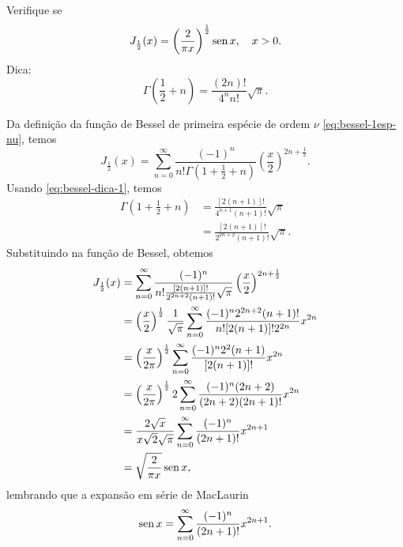   \begin{exeresol}
    Verifique se
    \begin{equation}
      J_{\frac{1}{2}}(x) = \left(\frac{2}{\pi x}\right)^{\frac{1}{2}}\operatorname{sen} x,\quad x>0.
    \end{equation}
    Dica:
    \begin{equation}\label{eq:bessel-dica-1}
      \Gamma\left(\frac{1}{2}+n\right) = \frac{(2n)!}{4^nn!}\sqrt{\pi}.
    \end{equation}
  \end{exeresol}
  \begin{resol}
    Da definição da função de Bessel de primeira espécie de ordem $\nu$ \eqref{eq:bessel-1esp-nu}, temos
    \begin{equation}
      J_{\frac{1}{2}}(x) = \sum_{n=0}^\infty \frac{(-1)^n}{n!\Gamma\left(1+\frac{1}{2}+n\right)}\left(\frac{x}{2}\right)^{2n+\frac{1}{2}}.
    \end{equation}
    Usando \eqref{eq:bessel-dica-1}, temos
    \begin{align}
      \Gamma\left(1+\frac{1}{2}+n\right) &= \frac{[2(n+1)]!}{4^{n+1}(n+1)!}\sqrt{\pi}\\
      &= \frac{[2(n+1)]!}{2^{2n+2}(n+1)!}\sqrt{\pi}. 
    \end{align}
    Substituindo na função de Bessel, obtemos
    \begin{align}
      J_{\frac{1}{2}}(x) &= \sum_{n=0}^\infty \frac{(-1)^n}{n!\frac{[2(n+1)]!}{2^{2n+2}(n+1)!}\sqrt{\pi}}\left(\frac{x}{2}\right)^{2n+\frac{1}{2}}\\
      &= \left(\frac{x}{2}\right)^{\frac{1}{2}}\frac{1}{\sqrt{\pi}}\sum_{n=0}^\infty \frac{(-1)^n2^{2n+2}(n+1)!}{n![2(n+1)]!2^{2n}}x^{2n}\\
      &= \left(\frac{x}{2\pi}\right)^{\frac{1}{2}}\sum_{n=0}^\infty \frac{(-1)^n2^2(n+1)}{[2(n+1)]!}x^{2n}\\
      &= \left(\frac{x}{2\pi}\right)^{\frac{1}{2}}2\sum_{n=0}^\infty \frac{(-1)^n(2n+2)}{(2n+2)(2n+1)!}x^{2n}\\
      &= \frac{2\sqrt{x}}{x\sqrt{2}\sqrt{\pi}}\sum_{n=0}^\infty \frac{(-1)^n}{(2n+1)!}x^{2n+1}\\
      &= \sqrt{\frac{2}{\pi x}}\operatorname{sen} x,
    \end{align}
    lembrando que a expansão em série de MacLaurin
    \begin{equation}
      \operatorname{sen} x = \sum_{n=0}^\infty \frac{(-1)^n}{(2n+1)!}x^{2n+1}.
    \end{equation}
  \end{resol}

